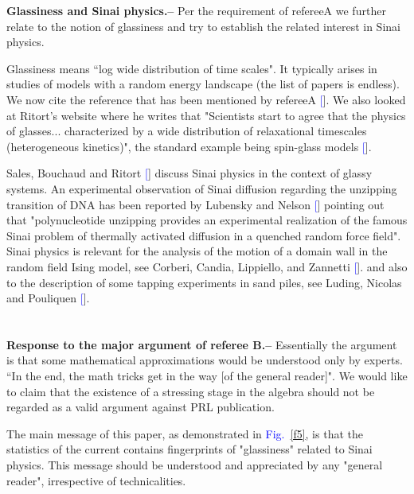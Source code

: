 \documentclass[aps,prl,floats,floatfix,twocolumn]{revtex4}
\newcommand{\sect}[1]{{\bf #1.-- }}
\newcommand{\Fig}[1]{\textcolor{blue}{Fig.}\!\!~\ref{#1}}
\renewcommand{\cite}[1]{\textcolor{blue}{[\onlinecite{#1}}]} %
\begin{document}
\sect{Glassiness and Sinai physics}
%
Per the requirement of refereeA we further relate to the notion 
of glassiness and try to establish the related interest in Sinai physics.   

Glassiness means ``log wide distribution of time scales". It typically arises 
in studies of models with a random energy landscape (the list of papers is endless). 
We now cite the reference that has been mentioned by refereeA \cite{Rit1}.
%
We also looked at Ritort's website where he writes that \textsf{"Scientists start 
to agree that the physics of glasses... characterized by a wide distribution 
of relaxational timescales (heterogeneous kinetics)"}, the standard example 
being spin-glass models \cite{Rit2}. 

Sales, Bouchaud and Ritort \cite{Rit3} discuss Sinai physics in the context of glassy systems.
%
An experimental observation of Sinai diffusion regarding the unzipping transition of DNA
has been reported by Lubensky and Nelson \cite{Nelson} pointing out that "polynucleotide unzipping provides an experimental realization of the famous Sinai problem of thermally activated diffusion in a quenched random force field". 
%
Sinai physics is relevant for the analysis of the motion of a domain wall 
in the random field Ising model, see Corberi, Candia, Lippiello, and Zannetti \cite{domainwalls}. 
%
and also to the description of some tapping experiments in sand piles, 
see Luding, Nicolas and Pouliquen \cite{sandpiles}. \\


\ \\ \ \\

\sect{Response to the major argument of referee B}
%
Essentially the argument is that some mathematical approximations would be understood only by experts. \textsf{``In the end, the math tricks get in the way [of the general reader]"}.
%
We would like to claim that the existence of a stressing stage in the algebra 
should not be regarded as a valid argument against PRL publication. 

The main message of this paper, as demonstrated in \Fig{f5}, is that the statistics of the current 
contains fingerprints of "glassiness" related to Sinai physics. This message should be understood 
and appreciated by any "general reader", irrespective of technicalities. \\
\end{document}
